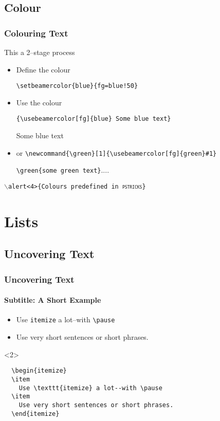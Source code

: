 \documentclass{article}
\newcommand{\bs}{\ensuremath{\backslash}}
\begin{document}
\subsection{Colour}

\begin{frame}[fragile]
  \frametitle{Colouring Text}
This a 2--stage process
\begin{itemize}
\item {\red Define} {\green the} {\blue colour}

\verb+\setbeamercolor{blue}{fg=blue!50}+\pause
\item Use the colour

\verb+{\usebeamercolor[fg]{blue} Some blue text}+

	{ Some blue text}
\pause
\item or
{\small\verb+\newcommand{\green}[1]{\usebeamercolor[fg]{green}#1}+}

\verb+\green{some green text}+....

\end{itemize}

\alert<4>{\texttt{\bs alert<4>\{Colours predefined in \textsc{pstricks}\}}}%
\end{frame}


\section{Lists}

\subsection{Uncovering Text}
\begin{frame}[fragile]
  \frametitle{Uncovering Text}
  \framesubtitle{Subtitle: A Short Example}

  \begin{itemize}
  \item
    Use \texttt{itemize} a lot--with \verb+\pause+\pause
  \item
    Use very short sentences or short phrases.
  \end{itemize}

  \begin{uncoverenv}<2>
  \begin{verbatim}
  \begin{itemize}
  \item
    Use \texttt{itemize} a lot--with \pause
  \item
    Use very short sentences or short phrases.
  \end{itemize}
  \end{verbatim}
  \end{uncoverenv}
\end{frame}
\end{document}
